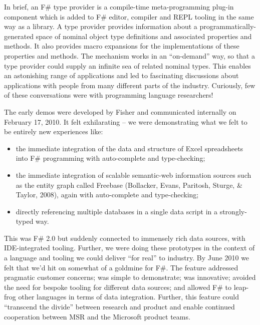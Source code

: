 \documentclass[acmsmall]{acmart}\settopmatter{}
\begin{document}
In brief, an F\# type provider is a compile-time meta-programming plug-in component which is added to F\# editor, compiler
and REPL tooling in the same way as a library. A type provider provides information about a programmatically-generated space
of nominal object type definitions and associated properties and methods.  It also provides macro expansions for the implementations
of these properties and methods. The mechanism works in an “on-demand” way, so that a type provider could supply an infinite
sea of related nominal types.  This enables an astonishing range of applications and led to fascinating discussions about applications
with people from many different parts of the industry.  Curiously, few of these conversations were with programming language researchers!

The early demos were developed by Fisher and communicated internally on February 17, 2010. It felt exhilarating – we were demonstrating
what we felt to be entirely new experiences like:


\begin{itemize}
\item the immediate integration of the data and structure of Excel spreadsheets into F\# programming with auto-complete and type-checking;
\item the immediate integration of scalable semantic-web information sources such as the entity graph called Freebase (Bollacker, Evans, Paritosh, Sturge, \& Taylor, 2008), again with auto-complete and type-checking;
\item directly referencing multiple databases in a single data script in a strongly-typed way.
\end{itemize}


This was F\# 2.0 but suddenly connected to immensely rich data sources, with IDE-integrated tooling.  Further, we were
doing these prototypes in the context of a language and tooling we could deliver “for real” to industry.  By June 2010 we
felt that we’d hit on somewhat of a goldmine for F\#. The feature addressed pragmatic customer concerns; was simple to
demonstrate; was innovative; avoided the need for bespoke tooling for different data sources; and allowed F\# to leap-frog
other languages in terms of data integration. Further, this feature could “transcend the divide” between research and product
and enable continued cooperation between MSR and the Microsoft product teams. 
\end{document}

